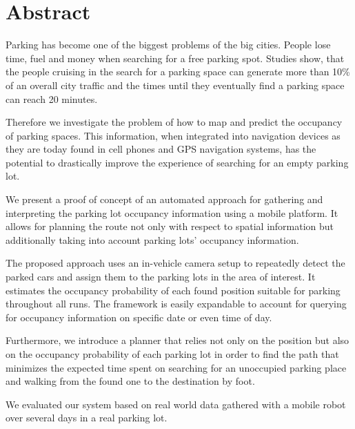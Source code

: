 \chapter*{Abstract}
\label{cha:abstract}

Parking has become one of the biggest problems of the big cities. People lose
time, fuel and money when searching for a free parking spot. Studies show,
that the people cruising in the search for a parking space can generate more
than 10\% of an overall city traffic and the times until they eventually find
a parking space can reach 20 minutes.

Therefore we investigate the problem of how to map and predict the occupancy
of parking spaces. This information, when integrated into navigation devices
as they are today found in cell phones and GPS navigation systems, has the
potential to drastically improve the experience of searching for an empty
parking lot.

We present a proof of concept of an automated approach for gathering and
interpreting the parking lot occupancy information using a mobile platform. It
allows for planning the route not only with respect to spatial information but
additionally taking into account parking lots' occupancy information.

The proposed approach uses an in-vehicle camera setup to repeatedly detect the
parked cars and assign them to the parking lots in the area of interest. It
estimates the occupancy probability of each found position suitable for
parking throughout all runs. The framework is easily expandable to account for
querying for occupancy information on specific date or even time of day.

Furthermore, we introduce a planner that relies not only on the position but
also on the occupancy probability of each parking lot in order to find the
path that minimizes the expected time spent on searching for an unoccupied
parking place and walking from the found one to the destination by foot.

We evaluated our system based on real world data gathered with a mobile robot
over several days in a real parking lot.



